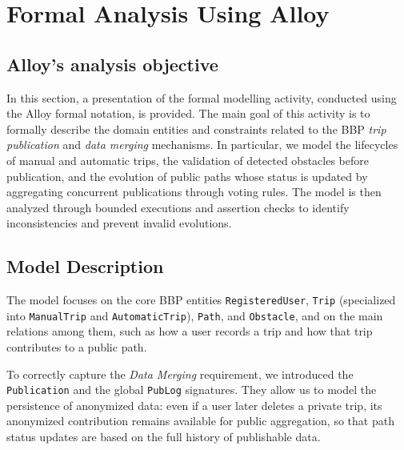 \chapter{Formal Analysis Using Alloy}
\label{ch:alloy}

\section{Alloy's analysis objective}
\label{sec:alloy_intro}

\noindent
In this section, a presentation of the formal modelling activity, conducted using the Alloy formal notation, is provided. The main goal of this activity is to formally describe the domain entities and constraints related to the BBP \emph{trip publication} and \emph{data merging} mechanisms. In particular, we model the lifecycles of manual and automatic trips, the validation of detected obstacles before publication, and the evolution of public paths whose status is updated by aggregating concurrent publications through voting rules. The model is then analyzed through bounded executions and assertion checks to identify inconsistencies and prevent invalid evolutions.

\section{Model Description}
\noindent
The model focuses on the core BBP entities \texttt{RegisteredUser}, \texttt{Trip} (specialized into \texttt{ManualTrip} and \texttt{AutomaticTrip}), \texttt{Path}, and \texttt{Obstacle}, and on the main relations among them, such as how a user records a trip and how that trip contributes to a public path.

\noindent
To correctly capture the \emph{Data Merging} requirement, we introduced the \texttt{Publication} and the global \texttt{PubLog} signatures. They allow us to model the persistence of anonymized data: even if a user later deletes a private trip, its anonymized contribution remains available for public aggregation, so that path status updates are based on the full history of publishable data.

